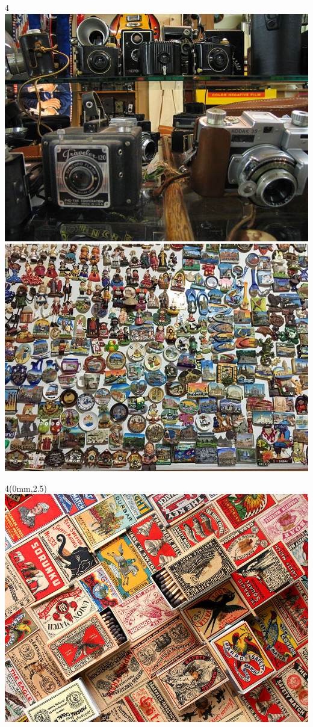 \begin{frame}
\begin{textblock*}{4\TPHorizModule}
    \includegraphics*[height=1.5\TPVertModule,width=\TPHorizModule]{640px-Cameras-TH}
    \includegraphics*[height=1.5\TPVertModule,width=\TPHorizModule]{640px-Fridge_magnets_board}
  \end{textblock*}
  \begin{textblock*}{4\TPHorizModule}(0mm,2.5\TPVertModule)
    \includegraphics*[height=1.5\TPVertModule,width=\TPHorizModule]{683px-Match_and_match_labels_100_years_ago}

\end{textblock*}
\end{frame}
